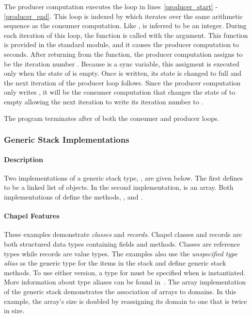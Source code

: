 The producer computation executes the  loop in lines~\ref{producer_start} -
\ref{producer_end}.  This
loop is indexed by  which iterates over the same arithmetic sequence
as the consumer computation.  Like ,  is inferred to be an integer.
During each iteration of this  loop, the  function is
called with the argument.  This  function is provided
in the  standard module, and it causes the producer computation to
 seconds.  After returning from the  function, 
the producer computation assigns  to be the iteration number .  
Because  is a sync variable, this assigment is executed only when the state of 
 is empty.  Once  is written, its state is changed to full and the
next iteration of the producer loop follows.  Since the producer computation only
writes , it will be the consumer computation that changes the state of
 to empty allowing the next iteration to write its iteration number
to .

The program terminates after  of both the consumer and
producer loops.

\subsubsection{Generic Stack Implementations}
\paragraph{Description}
Two implementations of a generic stack type, , are given below.  The first
defines  to be a linked list of  objects.  In
the second implementation,  is an array.  Both implementations of
 define the methods, , 
 and . 

\paragraph{Chapel Features}
These examples demonstrate {\em classes} and {\em records}.  
Chapel classes and records
are both structured data types containing fields and methods.
Classes are reference types while records are value types.
The examples also
use the {\em unspecified type alias}  as the generic type for the items
in the stack and define generic stack methods.  To use either version,
a type for  must be specified when  is instantiated.
More information about type aliases can be found 
in~.  The array implementation of
the generic stack demonstrates
the association of arrays to domains.  In this example, the array's size is
doubled by reassigning its domain to one that is twice in size.

